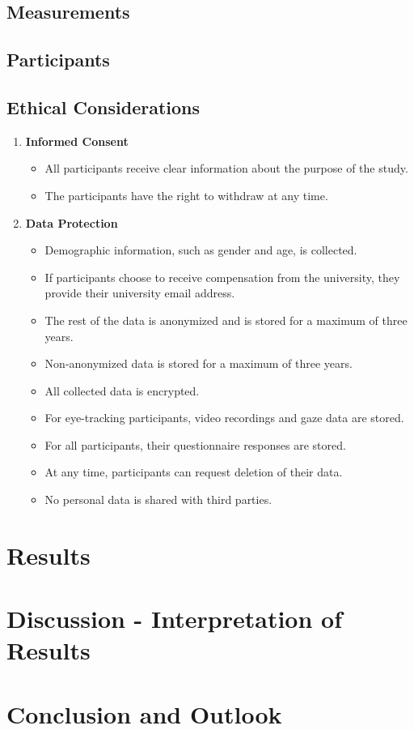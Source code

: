 \section{Measurements}

\section{Participants}


\section{Ethical Considerations}

\begin{enumerate}
    \item \textbf{Informed Consent}
    \begin{itemize}
        \item All participants receive clear information about the purpose of the study.
        \item The participants have the right to withdraw at any time.
    \end{itemize}
    
    \item \textbf{Data Protection}
    \begin{itemize}
        \item Demographic information, such as gender and age, is collected.
        \item If participants choose to receive compensation from the university, they provide their university email address.
        \item The rest of the data is anonymized and is stored for a maximum of three years.
        \item Non-anonymized data is stored for a maximum of three years.
        \item All collected data is encrypted.
        \item For eye-tracking participants, video recordings and gaze data are stored.
        \item For all participants, their questionnaire responses are stored.
        \item At any time, participants can request deletion of their data.
        \item No personal data is shared with third parties.
    \end{itemize}
\end{enumerate}

\chapter{Results}

\chapter{Discussion - Interpretation of Results}

\chapter{Conclusion and Outlook}
\label{sec:conclusion}
